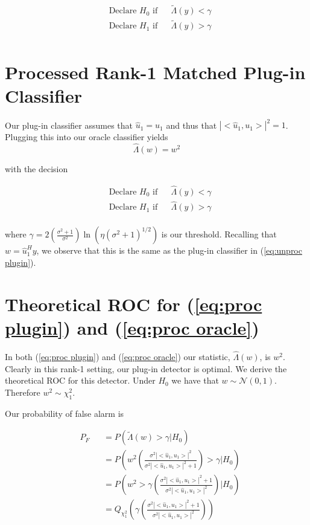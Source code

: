 \documentclass[english]{article}
\begin{document}
\begin{equation}
\begin{aligned}
&\text{Declare } H_0 \text{ if}
&& \tilde{\Lambda}(y) < \gamma\\
& \text{Declare } H_1 \text{ if}
&& \tilde{\Lambda}(y) > \gamma\\
\end{aligned}
\end{equation}

\section*{Processed Rank-1 Matched Plug-in Classifier}

Our plug-in classifier assumes that $\hat{u}_1=u_1$ and thus that $|<\hat{u}_1,u_1>|^2=1$. Plugging this into our oracle classifier yields
\begin{equation}\label{eq:proc plugin}
\boxed{\hat{\Lambda}(w) = w^2}
\end{equation}

with the decision

\begin{equation}
\begin{aligned}
&\text{Declare } H_0 \text{ if}
&& \hat{\Lambda}(y) < \gamma\\
& \text{Declare } H_1 \text{ if}
&& \hat{\Lambda}(y) > \gamma\\
\end{aligned}
\end{equation}

where $\gamma = 2\left(\frac{\sigma^2+1}{\sigma^2}\right)\ln\left(\eta\left(\sigma^2+1\right)^{1/2}\right)$ is our threshold. Recalling that $w=\hat{u}_1^Hy$, we observe that this is the same as the plug-in classifier in (\ref{eq:unproc plugin}).

\section*{Theoretical ROC for (\ref{eq:proc plugin}) and (\ref{eq:proc oracle})}

In both (\ref{eq:proc plugin}) and (\ref{eq:proc oracle}) our statistic, $\hat{\Lambda}(w)$, is $w^2$. Clearly in this rank-1 setting, our plug-in detector is optimal. We derive the theoretical ROC for this detector. Under $H_0$ we have that $w\sim\mathcal{N}(0,1)$. Therefore $w^2\sim\chi^2_1$.

Our probability of false alarm is

\begin{equation}
\begin{aligned}
&P_F
&&=P(\tilde{\Lambda}(w) >\gamma|H_0) \\
&&&= P\left(w^2\left(\frac{\sigma^2|<\hat{u}_1,u_1>|^2}{\sigma^2|<\hat{u}_1,u_1>|^2+1}\right)>\gamma|H_0\right)\\
&&&=P\left(w^2>\gamma\left(\frac{\sigma^2|<\hat{u}_1,u_1>|^2+1}{\sigma^2|<\hat{u}_1,u_1>|^2}\right)|H_0\right)\\
&&&=Q_{\chi^2_1}\left(\gamma\left(\frac{\sigma^2|<\hat{u}_1,u_1>|^2+1}{\sigma^2|<\hat{u}_1,u_1>|^2}\right)\right)
\end{aligned}
\end{equation}
\end{document}

